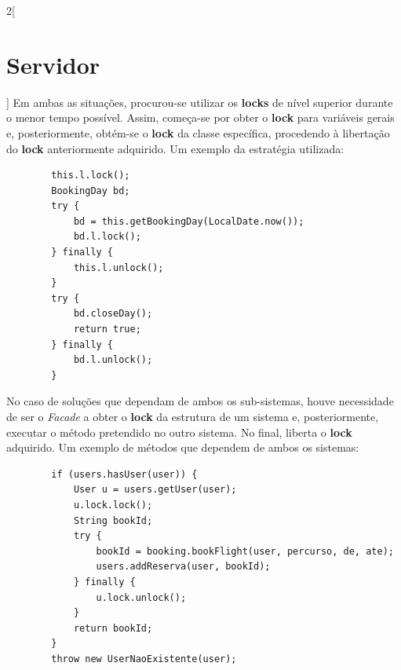 \documentclass[a4paper,11pt]{article}
\begin{document}
\begin{multicols}{2}[\section{Servidor}]
    Em ambas as situações, procurou-se utilizar os \textbf{locks} de nível superior
    durante o menor tempo possível.
    Assim, começa-se por obter o \textbf{lock} para variáveis gerais e, posteriormente,
    obtém-se o \textbf{lock} da classe específica, procedendo à libertação do \textbf{lock}
    anteriormente adquirido.
    Um exemplo da estratégia utilizada:
    \begin{verbatim}
		this.l.lock();
		BookingDay bd;
		try {
			bd = this.getBookingDay(LocalDate.now());
			bd.l.lock();
		} finally {
			this.l.unlock();
		}
		try {
			bd.closeDay();
			return true;
		} finally {
			bd.l.unlock();
		}
    \end{verbatim}
    No caso de soluções que dependam de ambos os sub-sistemas, houve necessidade
    de ser o \textit{Facade} a obter o \textbf{lock} da estrutura de um sistema e,
    posteriormente, executar o método pretendido no outro sistema.
    No final, liberta o \textbf{lock} adquirido.
    Um exemplo de métodos que dependem de ambos os sistemas:
    \begin{verbatim}
		if (users.hasUser(user)) {
			User u = users.getUser(user);
			u.lock.lock();
			String bookId;
			try {
				bookId = booking.bookFlight(user, percurso, de, ate);
				users.addReserva(user, bookId);
			} finally {
				u.lock.unlock();
			}
			return bookId;
		}
		throw new UserNaoExistente(user);
    \end{verbatim}
\end{multicols}
\end{document}
